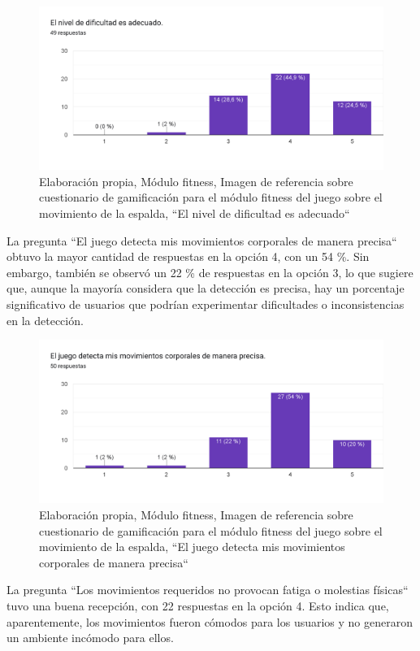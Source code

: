 \begin{figure}[H]
  \centering
  \includegraphics[width=0.7\linewidth]{Imagenes/fd3.png}
  \caption{Elaboración propia, Módulo fitness, Imagen de referencia sobre cuestionario de gamificación para el módulo fitness del juego sobre el movimiento de la espalda, ``El nivel de dificultad es adecuado``}
  \label{fig:cuestionario14fitness}
\end{figure}


La pregunta ``El juego detecta mis movimientos corporales de manera precisa`` obtuvo la mayor cantidad de respuestas en la opción 4, con un 54 \%. Sin embargo, también se observó un 22 \% de respuestas en la opción 3, lo que sugiere que, aunque la mayoría considera que la detección es precisa, hay un porcentaje significativo de usuarios que podrían experimentar dificultades o inconsistencias en la detección.

\begin{figure}[H]
  \centering
  \includegraphics[width=0.7\linewidth]{Imagenes/fd4.png}
  \caption{Elaboración propia, Módulo fitness, Imagen de referencia sobre cuestionario de gamificación para el módulo fitness del juego sobre el movimiento de la espalda, ``El juego detecta mis movimientos corporales de manera precisa``}
  \label{fig:cuestionario15fitness}
\end{figure}

La pregunta ``Los movimientos requeridos no provocan fatiga o molestias físicas`` tuvo una buena recepción, con 22 respuestas en la opción 4. Esto indica que, aparentemente, los movimientos fueron cómodos para los usuarios y no generaron un ambiente incómodo para ellos.

